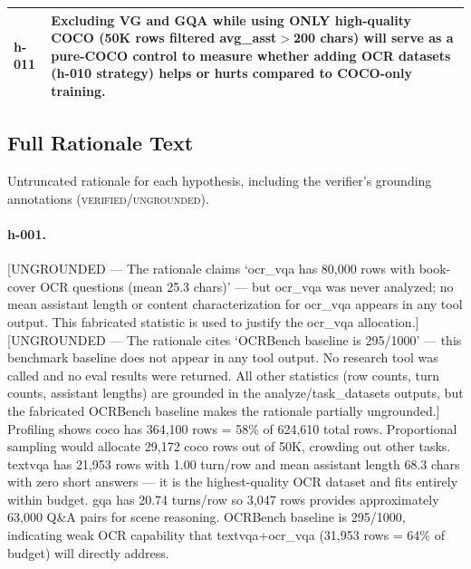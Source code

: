 \begin{table}[H]
\begin{tabular}{lp{6.2in}}
h-011 & Excluding VG and GQA while using ONLY high-quality COCO (50K rows filtered avg\_asst$>$200 chars) will serve as a pure-COCO control to measure whether adding OCR datasets (h-010 strategy) helps or hurts compared to COCO-only training. \\
\bottomrule
\end{tabular}
\end{table}

\subsection{Full Rationale Text}

{\footnotesize
Untruncated rationale for each hypothesis, including the verifier's grounding annotations (\textsc{verified}/\textsc{ungrounded}).

\paragraph{h-001.}
[UNGROUNDED --- The rationale claims `ocr\_vqa has 80,000 rows with book-cover OCR questions (mean 25.3 chars)' --- but ocr\_vqa was never analyzed; no mean assistant length or content characterization for ocr\_vqa appears in any tool output. This fabricated statistic is used to justify the ocr\_vqa allocation.] [UNGROUNDED --- The rationale cites `OCRBench baseline is 295/1000' --- this benchmark baseline does not appear in any tool output. No research tool was called and no eval results were returned. All other statistics (row counts, turn counts, assistant lengths) are grounded in the analyze/task\_datasets outputs, but the fabricated OCRBench baseline makes the rationale partially ungrounded.] Profiling shows coco has 364,100 rows = 58\% of 624,610 total rows. Proportional sampling would allocate 29,172 coco rows out of 50K, crowding out other tasks. textvqa has 21,953 rows with 1.00 turn/row and mean assistant length 68.3 chars with zero short answers --- it is the highest-quality OCR dataset and fits entirely within budget. gqa has 20.74 turns/row so 3,047 rows provides approximately 63,000 Q\&A pairs for scene reasoning. OCRBench baseline is 295/1000, indicating weak OCR capability that textvqa+ocr\_vqa (31,953 rows = 64\% of budget) will directly address.

}
